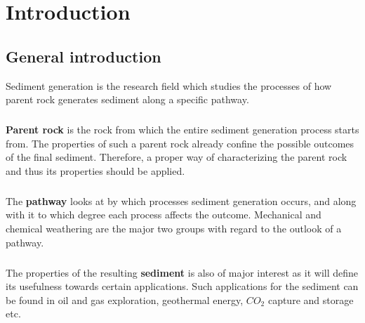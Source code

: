 \chapter{Introduction}\label{ch:introduction}

\instructionsintroduction



\section{General introduction}
    Sediment generation is the research field which studies the processes of how parent rock generates sediment along a specific pathway. %

    \paragraph*{}
    \textbf{Parent rock} is the rock from which the entire sediment generation process starts from. %
    The properties of such a parent rock already confine the possible outcomes of the final sediment. %
    Therefore, a proper way of characterizing the parent rock and thus its properties should be applied. %

    \paragraph*{}
    The \textbf{pathway} looks at by which processes sediment generation occurs, and along with it to which degree each process affects the outcome. %
    Mechanical and chemical weathering are the major two groups with regard to the outlook of a pathway. %

    \paragraph*{}
    The properties of the resulting \textbf{sediment} is also of major interest as it will define its usefulness towards certain applications. %
    Such applications for the sediment can be found in oil and gas exploration, geothermal energy, \(CO_2\) capture and storage etc. %

